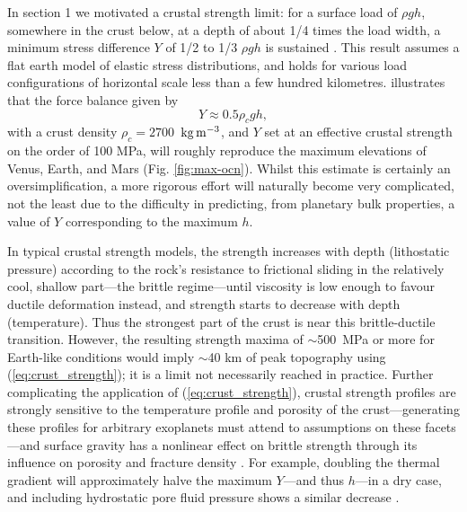 In section 1 we motivated a crustal strength limit: for a surface load of $\rho g h$, somewhere in the crust below, at a depth of about 1/4 times the load width, a minimum stress difference $Y$ of 1/2 to 1/3 $\rho g h$ is sustained \citep{jeffreys_earth_1929}. This result assumes a flat earth model of elastic stress distributions, and holds for various load configurations of horizontal scale less than a few hundred kilometres. \citet{melosh_planetary_2011} illustrates that the force balance given by
\begin{equation}\label{eq:crust_strength}
    Y \approx 0.5 \rho_c g h,
\end{equation}
with a crust density $\rho_c = 2700$~$\rm{kg\,m^{-3}}$, and $Y$ set at an effective crustal strength on the order of 100 MPa, will roughly reproduce the maximum elevations of Venus, Earth, and Mars (Fig. \ref{fig:max-ocn}). Whilst this estimate is certainly an oversimplification, a more rigorous effort will naturally become very complicated, not the least due to the difficulty in predicting, from planetary bulk properties, a value of $Y$ corresponding to the maximum $h$.%

In typical crustal strength models, the strength increases with depth (lithostatic pressure) according to the rock's resistance to frictional sliding in the relatively cool, shallow part---the brittle regime---until viscosity is low enough to favour ductile deformation instead, and strength starts to decrease with depth (temperature). Thus the strongest part of the crust is near this brittle-ductile transition. However, the resulting strength maxima of $\sim$500~MPa or more for Earth-like conditions \citep{katayama_strength_2021} would imply $\sim$40 km of peak topography using (\ref{eq:crust_strength}); it is a limit not necessarily reached in practice. Further complicating the application of (\ref{eq:crust_strength}), crustal strength profiles are strongly sensitive to the temperature profile and porosity of the crust---generating these profiles for arbitrary exoplanets must attend to assumptions on these facets \citep{byrne_effects_2021}---and surface gravity has a nonlinear effect on brittle strength through its influence on porosity and fracture density \citep{heap_low_2017}. For example, doubling the thermal gradient will approximately halve the maximum $Y$---and thus $h$---in a dry case, and including hydrostatic pore fluid pressure shows a similar decrease \citep{katayama_strength_2021}.

